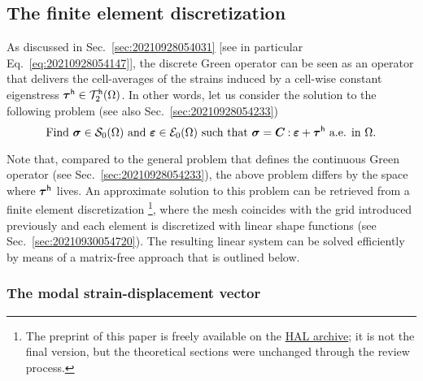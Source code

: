 \subsection{The finite element discretization}

As discussed in Sec.~\ref{sec:20210928054031} [see in particular
Eq.~\eqref{eq:20210928054147}], the discrete Green operator can be seen as an
operator that delivers the cell-averages of the strains induced by a cell-wise
constant eigenstress \(\boldsymbol\tau^\mathsf{h}\in\mathcal T_2^\mathsf{h}(\Omega)\). In
other words, let us consider the solution to the following problem (see also
Sec.~\ref{sec:20210928054233})
\begin{equation}
  \label{eq:20210914140834}
  \text{Find }\boldsymbol\sigma\in\mathcal S_0(\Omega)
  \text{ and }\boldsymbol\varepsilon\in\mathcal E_0(\Omega)
  \text{ such that }\boldsymbol\sigma=\boldsymbol C\mathbin{\mathord{:}}\boldsymbol\varepsilon+\boldsymbol\tau^\mathsf{h}
  \text{ a.e. in }\Omega.
\end{equation}

Note that, compared to the general problem that defines the continuous Green
operator (see Sec.~\ref{sec:20210928054233}), the above problem differs by the
space where \(\boldsymbol\tau^\mathsf{h}\) lives. An approximate solution to this
problem can be retrieved from a finite element discretization
\parencite{bris2017}\footnote{The preprint of this paper is freely available on
  the \href{https://hal-enpc.archives-ouvertes.fr/hal-01304603}{HAL archive}; it
  is not the final version, but the theoretical sections were unchanged through
  the review process.}, where the mesh coincides with the grid introduced
previously and each element is discretized with linear shape functions (see
Sec.~\ref{sec:20210930054720}). The resulting linear system can be solved
efficiently by means of a matrix-free approach that is outlined below.

\subsubsection{The modal strain-displacement vector}

